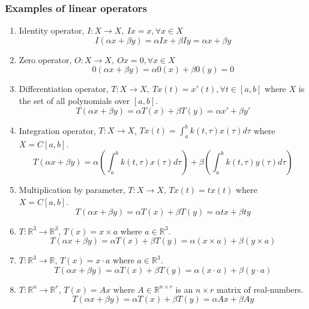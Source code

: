\subsubsection{Examples of linear operators}
\begin{enumerate}
	\item Identity operator, $I : X \to X,\ Ix = x, \forall x \in X $
		\[ I(\alpha x + \beta y) = \alpha Ix + \beta Iy = \alpha x + \beta y \]
	\item Zero operator, $O : X \to X,\ Ox = 0, \forall x \in X$
		\[ 0(\alpha x + \beta y) = \alpha 0(x) + \beta 0(y) = 0 \] 
	\item Differentiation operator, $T : X \to X,\ Tx(t) = x'(t), \forall t \in [a,b]$ where $X$ is the set of all polynomials over $[a,b]$.
		\[ T(\alpha x + \beta y) = \alpha T(x) + \beta T(y) = \alpha x' +\beta y'  \] 
	\item Integration operator, $T : X \to X$, $\displaystyle Tx(t) = \int_a^b k(t,\tau) x(\tau) d\tau$ where $X = C[a,b]$.
		\[ T(\alpha x + \beta y) = \alpha \left( \int_a^b k(t,\tau) x(\tau) d\tau \right) +\beta \left( \int_a^b k(t,\tau) y(\tau) d\tau \right)  \] 
	\item Multiplication by parameter, $T : X \to X$, $Tx(t) = tx(t)$ where $X = C[a,b]$.
		\[ T(\alpha x + \beta y) = \alpha T(x) + \beta T(y) = \alpha tx +\beta ty \] 
	\item $T : \mathbb{R}^3 \to \mathbb{R}^3$, $T(x) = x \times a$ where $a \in \mathbb{R}^3$.
		\[ T(\alpha x + \beta y) = \alpha T(x) + \beta T(y) = \alpha (x \times a) +\beta (y \times a)  \] 
	\item $T : \mathbb{R}^3 \to \mathbb{R}$, $T(x) = x \cdot a$ where $a \in \mathbb{R}^3$.
		\[ T(\alpha x + \beta y) = \alpha T(x) + \beta T(y) = \alpha (x \cdot a) +\beta (y \cdot a)  \] 
	\item $T : \mathbb{R}^n \to \mathbb{R}^r$, $T(x) = Ax$ where $A \in \mathbb{R}^{n \times r}$ is an $n \times r$ matrix of real-numbers.
		\[ T(\alpha x + \beta y) = \alpha T(x) + \beta T(y) = \alpha Ax +\beta Ay \] 
\end{enumerate}

